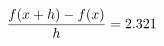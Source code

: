 \documentclass[preview]{standalone}
\begin{document}
\begin{align*}
\special{dvisvgm:raw <g id='unique000'>}\frac{f(x+h)-f(x)}{h} = 2.321\special{dvisvgm:raw </g>}
\end{align*}
\end{document}

